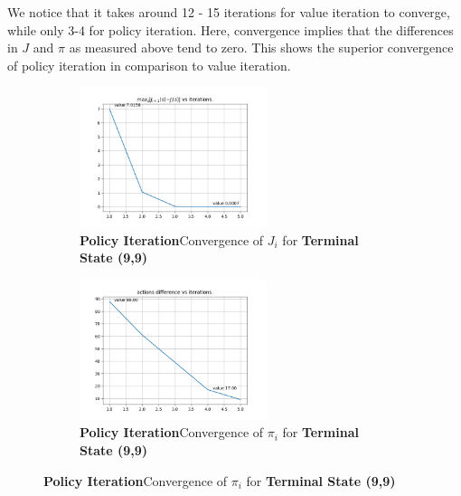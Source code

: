 We notice that it takes around 12 - 15 iterations for value iteration to converge, while only 3-4 for policy iteration. Here, convergence implies that the differences in $J$ and $\pi$ as measured above tend to zero. This shows the superior convergence of policy iteration in comparison to value iteration.

\begin{figure}[h]
\begin{subfigure}
\centering
\includegraphics[angle=0,width=0.6\textwidth]{hw4/logs/policy_iter_t=99_N=20/convergence-difference-till-6.png}
\caption{ \textbf{Policy Iteration}Convergence of $J_i$ for \textbf{Terminal State (9,9)}}
\end{subfigure}

\begin{subfigure}
\centering
\includegraphics[angle=0,width=0.6\textwidth]{hw4/logs/policy_iter_t=99_N=20/actions-difference-till-6.png}
\caption{ \textbf{Policy Iteration}Convergence of $\pi_i$ for \textbf{Terminal State (9,9)}}
\end{subfigure}
\end{figure}

